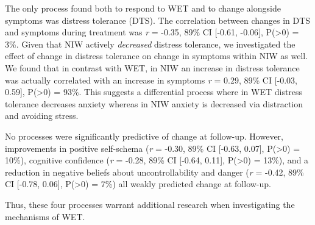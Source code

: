 \documentclass[
  man,floatsintext]{apa7}
\begin{document}
The only process found both to respond to WET and to change alongside symptoms was distress tolerance (DTS).
The correlation between changes in DTS and symptoms during treatment was \emph{r} = -0.35, 89\% CI {[}-0.61, -0.06{]}, P(\textgreater0) = 3\%.
Given that NIW actively \emph{decreased} distress tolerance, we investigated the effect of change in distress tolerance on change in symptoms within NIW as well.
We found that in contrast with WET, in NIW an increase in distress tolerance was actually correlated with an increase in symptoms \emph{r} = 0.29, 89\% CI {[}-0.03, 0.59{]}, P(\textgreater0) = 93\%.
This suggests a differential process where in WET distress tolerance decreases anxiety whereas in NIW anxiety is decreased via distraction and avoiding stress.

No processes were significantly predictive of change at follow-up.
However, improvements in positive self-schema (\emph{r} = -0.30, 89\% CI {[}-0.63, 0.07{]}, P(\textgreater0) = 10\%), cognitive confidence (\emph{r} = -0.28, 89\% CI {[}-0.64, 0.11{]}, P(\textgreater0) = 13\%), and a reduction in negative beliefs about uncontrollability and danger (\emph{r} = -0.42, 89\% CI {[}-0.78, 0.06{]}, P(\textgreater0) = 7\%) all weakly predicted change at follow-up.

Thus, these four processes warrant additional research when investigating the mechanisms of WET.
\end{document}
